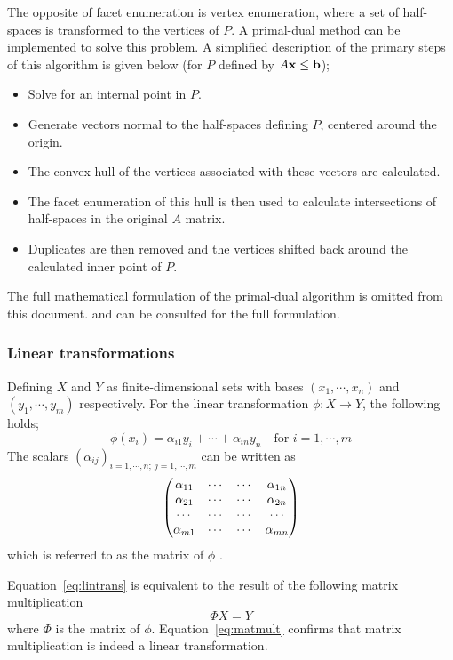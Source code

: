 The opposite of facet enumeration is vertex enumeration, where a set of half-spaces is transformed to the vertices of $P$.
A primal-dual method can be implemented to solve this problem.
A simplified description of the primary steps of this algorithm is given below (for $P$ defined by $A{\bf {x}}\leq{\bf {b}}$);
\begin{itemize}
\item Solve for an internal point in $P$.
\item Generate vectors normal to the half-spaces defining $P$, centered around the origin.
\item The convex hull of the vertices associated with these vectors are calculated.
\item The facet enumeration of this hull is then used to calculate intersections of half-spaces in the original $A$ matrix.
\item Duplicates are then removed and the vertices shifted back around the calculated inner point of $P$.
\end{itemize}
The full mathematical formulation of the primal-dual algorithm is omitted from this document.
\citet[636-639]{primaldual1} and \citet{primaldual2} can be consulted for the full formulation. 

\subsubsection{Linear transformations}
Defining $X$ and $Y$ as finite-dimensional sets with bases $(x_1,\cdots,x_n)$ and $(y_1,\cdots,y_m)$ respectively.
For the linear transformation $\phi : X \to Y$, the following holds;
\begin{equation}
  \label{eq:lintrans}
  \phi(x_i) = \alpha_{i1}y_i+\cdots+\alpha_{in}y_n \text{~~~for~} i = 1, \cdots, m
\end{equation}
The scalars $(\alpha_{ij})_{i=1,\cdots,n;~j=1,\cdots,m}$ can be written as
\begin{equation}
  \begin{pmatrix}
    \alpha_{11} &\cdots &\cdots &\alpha_{1n} \\
    \alpha_{21} &\cdots &\cdots &\alpha_{2n} \\
    \cdots     &\cdots &\cdots &\cdots \\
    \alpha_{m1} &\cdots &\cdots &\alpha_{mn} \\
  \end{pmatrix} \notag
\end{equation}
which is referred to as the matrix of $\phi$ \citep[48-49,~166]{leung}.

Equation~\ref{eq:lintrans} is equivalent to the result of the following matrix multiplication
\begin{equation}
  \label{eq:matmult}
  \Phi X = Y
\end{equation}
where $\Phi$ is the matrix of $\phi$.
Equation~\ref{eq:matmult} confirms that matrix multiplication is indeed a linear transformation.

